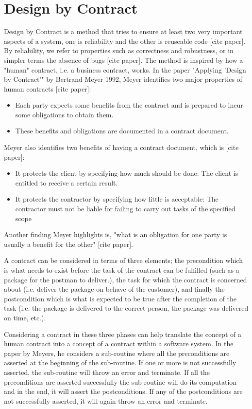 \section{Design by Contract}\label{sec:DbC}

Design by Contract is a method that tries to ensure at least two very important aspects of a system, one is reliability and the other is reuseable code [cite paper].
By reliability, we refer to properties such as correctness and robustness, or in simpler terms the absence of bugs [cite paper].
The method is inspired by how a "human" contract, i.e. a business contract, works.
In the paper "Applying 'Design by Contract'" by Bertrand Meyer 1992, Meyer identifies two major properties of human contracts [cite paper]:
\begin{itemize}
    \item Each party expects some benefits from the contract and is prepared to incur some obligations to obtain them.
    \item These benefits and obligations are documented in a contract document.
\end{itemize}

Meyer also identifies two benefits of having a contract document, which is [cite paper]:
\begin{itemize}
    \item It protects the client by specifying how much should be done: The client is entitled to receive a certain result.
    \item It protects the contractor by specifying how little is acceptable: The contractor must not be liable for failing to carry out tasks of the specified scope
\end{itemize}

Another finding Meyer highlights is, "what is an obligation for one party is usually a benefit for the other" [cite paper].

A contract can be considered in terms of three elements; the precondition which is what needs to exist before the task of the contract can be fulfilled (such as a package for the postman to deliver.), the task for which the contract is concerned about (i.e. deliver the package on behave of the customer), and finally the postcondition which is what is expected to be true after the completion of the task (i.e. the package is delivered to the correct person, the package was delivered on time, etc.).

Considering a contract in these three phases can help translate the concept of a human contract into a concept of a contract within a software system. In the paper by Meyers, he considers a sub-routine where all the preconditions are asserted at the beginning of the sub-routine.
If one or more is not successfully asserted, the sub-routine will throw an error and terminate. 
If all the preconditions are asserted successfully the sub-routine will do its computation and in the end, it will assert the postconditions. 
If any of the postconditions are not successfully asserted, it will again throw an error and terminate.

